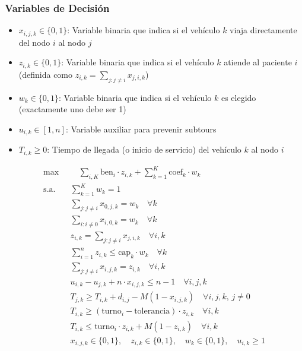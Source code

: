 \documentclass[12pt]{article}
\begin{document}
\subsubsection*{Variables de Decisión}

\begin{itemize}
    \item $x_{i,j,k} \in \{0,1\}$: Variable binaria que indica si el vehículo $k$ viaja directamente del nodo $i$ al nodo $j$
    \item $z_{i,k} \in \{0,1\}$: Variable binaria que indica si el vehículo $k$ atiende al paciente $i$ (definida como $z_{i,k} = \sum_{j: j \ne i} x_{j,i,k}$)
    \item $w_k \in \{0,1\}$: Variable binaria que indica si el vehículo $k$ es elegido (exactamente uno debe ser 1)
    \item $u_{i,k} \in [1,n]$: Variable auxiliar para prevenir subtours
    \item $T_{i,k} \geq 0$: Tiempo de llegada (o inicio de servicio) del vehículo $k$ al nodo $i$
\end{itemize}

\begin{align*}
  \max & \quad \sum_{i,K} \text{ben}_i \cdot z_{i,k} + \sum_{k=1}^{K} \text{coef}_k \cdot w_k \\
  \text{s.a.} \quad
    & \sum_{k=1}^{K} w_k = 1 \\
    & \sum_{j: j \ne i} x_{0,j,k} = w_k \quad \forall k \\
    & \sum_{i: i \ne 0} x_{i,0,k} = w_k \quad \forall k \\
    & z_{i,k} = \sum_{j: j \ne i} x_{j,i,k} \quad \forall i,k \\
    & \sum_{i=1}^{n} z_{i,k} \leq \text{cap}_k \cdot w_k \quad \forall k \\
    & \sum_{j: j \ne i} x_{i,j,k} = z_{i,k} \quad \forall i,k \\
    & u_{i,k} - u_{j,k} + n \cdot x_{i,j,k} \leq n - 1 \quad \forall i,j,k \\
    & T_{j,k} \geq T_{i,k} + d_{i,j} - M(1 - x_{i,j,k}) \quad \forall i,j,k, \, j \ne 0 \\
    & T_{i,k} \geq (\text{turno}_i - \text{tolerancia}) \cdot z_{i,k} \quad \forall i,k \\
    & T_{i,k} \leq \text{turno}_i \cdot z_{i,k} + M(1 - z_{i,k}) \quad \forall i,k \\
    & x_{i,j,k} \in \{0,1\}, \quad z_{i,k} \in \{0,1\}, \quad w_k \in \{0,1\}, \quad u_{i,k} \geq 1
\end{align*}
\end{document}

